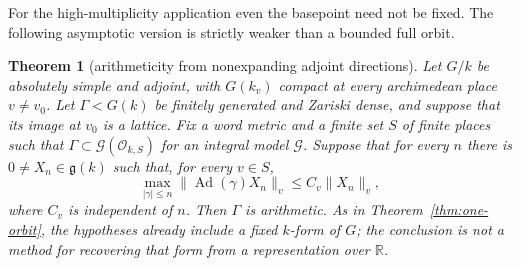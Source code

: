 \documentclass[11pt,reqno]{amsart}
\newtheorem{theorem}{Theorem}[section]
\theoremstyle{definition}
\theoremstyle{remark}
\newcommand{\R}{\mathbb R}
\newcommand{\cO}{\mathcal O}
\newcommand{\Ad}{\operatorname{Ad}}
\begin{document}
For the high-multiplicity application even the basepoint need not be fixed.
The following asymptotic version is strictly weaker than a bounded full orbit.

\begin{theorem}[arithmeticity from nonexpanding adjoint directions]
\label{thm:asymptotic-orbit}
Let \(G/k\) be absolutely simple and adjoint, with
\(G(k_v)\) compact at every archimedean place \(v\ne v_0\).  Let
\(\Gamma<G(k)\) be finitely generated and Zariski dense, and suppose that
its image at \(v_0\) is a lattice.  Fix a word metric and a finite set \(S\)
of finite places such that
\(\Gamma\subset\mathcal G(\cO_{k,S})\) for an integral model
\(\mathcal G\).  Suppose that for every \(n\) there is
\(0\ne X_n\in\mathfrak g(k)\) such that, for every \(v\in S\),
\[
 \max_{|\gamma|\le n}\|\Ad(\gamma)X_n\|_v
 \le C_v\|X_n\|_v,
\]
where \(C_v\) is independent of \(n\).  Then \(\Gamma\) is arithmetic.
As in Theorem~\ref{thm:one-orbit}, the hypotheses already include a fixed
\(k\)-form of \(G\); the conclusion is not a method for recovering that form
from a representation over \(\R\).
\end{theorem}
\end{document}
